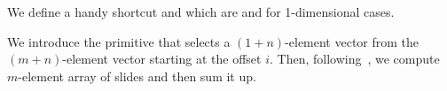 We define a handy shortcut  and  which are  and 
for 1-dimensional cases.
We introduce the  primitive that selects a $(1+n)$-element vector
from the $(m+n)$-element vector starting at the offset $i$.  Then,
following~\cite{cnn-array}, we compute $m$-element array of slides
and then sum it up.
